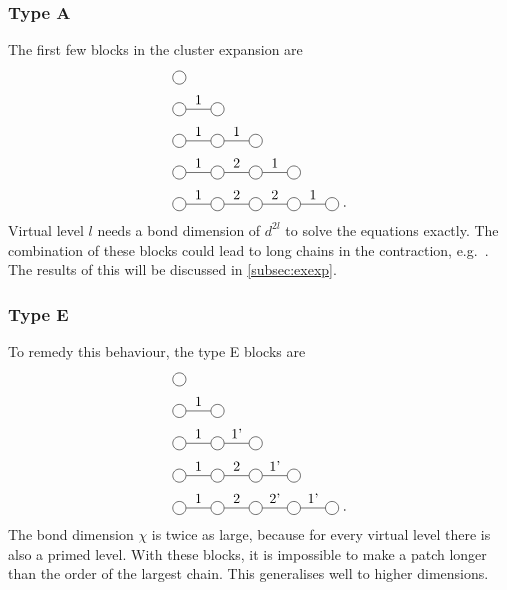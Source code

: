 \documentclass[twocolumn]{article}
\newcounter{a}
\newcounter{b}
\begin{document}
\subsubsection{Type A}
The first few blocks in the cluster expansion are
\begin{subequations}
    \begin{align}
         & \mpob{1}{ {,}  }{}{}{}{{,,}}                                      \\
         & \mpob{2}{ {,"1",}  }{}{}{}{{,,}}                                  \\
         & \mpob{3}{ {,"1","1",}  }{}{}{}{{,,,}}                             \\
         & \mpob{4}{ {,"1","2","1",}  }{}{}{}{{,,,,,}}    \label{2sitepatch} \\
         & \mpob{5}{ {,"1","2","2","1",}  }{}{}{}{{,,,,,}} \; .
    \end{align}
\end{subequations}
Virtual level $l$ needs a bond dimension of $d^{2 l}$ to solve the equations exactly.  The combination of these blocks could lead to long chains in the contraction, e.g.\
. The results of this will be discussed in \cref{subsec:exexp}.

\subsubsection{Type E}
To remedy this behaviour, the type E blocks are
\begin{subequations}
    \begin{align}
         & \mpob{1}{ {,}  }{}{}{}{{,,}}                          \\
         & \mpob{2}{ {,"1",}  }{}{}{}{{,,}}                      \\
         & \mpob{3}{ {,"1","1'",}  }{}{}{}{{,,,}}                \\
         & \mpob{4}{ {,"1","2","1'",}  }{}{}{}{{,,,,,}}          \\
         & \mpob{5}{ {,"1","2","2'","1'",}  }{}{}{}{{,,,,,}} \;.
    \end{align}
\end{subequations}
The bond dimension $\chi$ is twice as large, because for every virtual level there is also a primed level. With these blocks, it is impossible to make a patch longer than the order of the largest chain. This generalises well to higher dimensions.
\end{document}
